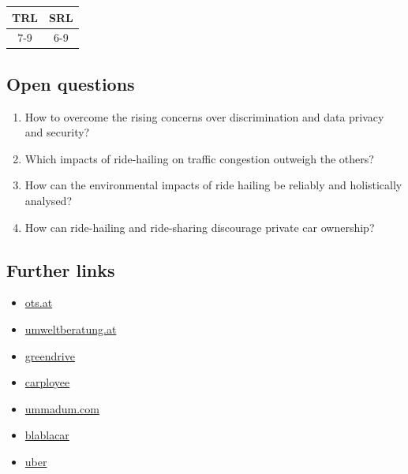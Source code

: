 \documentclass[
]{book}
\providecommand{\tightlist}{%
  \setlength{\itemsep}{0pt}\setlength{\parskip}{0pt}}
\begin{document}
\begin{longtable}[]{@{}cc@{}}
\toprule
TRL & SRL\tabularnewline
\midrule
\endhead
7-9 & 6-9\tabularnewline
\bottomrule
\end{longtable}

\hypertarget{open-questions-34}{%
\subsection*{Open questions}\label{open-questions-34}}

\begin{enumerate}
\def\labelenumi{\arabic{enumi}.}
\tightlist
\item
  How to overcome the rising concerns over discrimination and data privacy and security?
\item
  Which impacts of ride-hailing on traffic congestion outweigh the others?
\item
  How can the environmental impacts of ride hailing be reliably and holistically analysed?
\item
  How can ride-hailing and ride-sharing discourage private car ownership?
\end{enumerate}

\hypertarget{further-links-28}{%
\subsection*{Further links}\label{further-links-28}}

\begin{itemize}
\tightlist
\item
  \href{https://www.ots.at/presseaussendung/OTS_20210113_OTS0026/free-now-will-als-erste-mobilitaetsplattform-in-europa-bis-2030-null-emissionen-erreichen}{ots.at}
\item
  \href{https://www.umweltberatung.at/carsharing-mitfahrboersen}{umweltberatung.at}
\item
  \href{https://greendrive.at/premium/\#benefits}{greendrive}
\item
  \href{https://www.carployee.com/\#start-section}{carployee}
\item
  \href{https://ummadum.com/}{ummadum.com}
\item
  \href{https://www.blablacar.de/}{blablacar}
\item
  \href{https://www.uber.com/at/de/}{uber}
\end{itemize}
\end{document}
